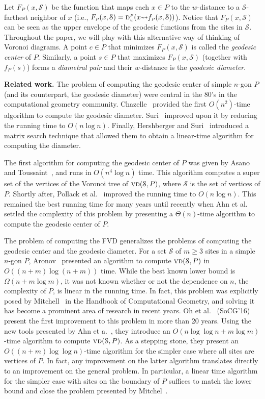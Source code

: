 \documentclass[a4paper,UKenglish]{socg-lipics-v2018}
\newcommand{\F}[2][P]{\ensuremath{F_{\scriptscriptstyle #1}(#2)}}
\newcommand{\s}{\mathcal S}
\newcommand{\dd}[3][P]{\ensuremath{\textsc{d}_{\scriptscriptstyle w}^{\scriptscriptstyle #1}(#2 {\leadsto} #3)}}
\newcommand{\f}[2][P]{\ensuremath{f_{\scriptscriptstyle #1}(#2)}}
\newcommand{\vd}[2][P]{\textsc{vd}(#2, #1)}
\begin{document}
Let $\F{x, \s}$ be the function that maps each $x\in P$ to the $w$-distance to a $\s$-farthest neighbor of $x$ (i.e., $\F{x, \s} = \dd{x}{\f{x, \s}}$).
Notice that $\F{x, \s}$ can be seen as the upper envelope of the geodesic functions from the sites in $\s$.
Throughout the paper, we will play with this alternative way of thinking of Voronoi diagrams.
A point $c\in P$ that minimizes $\F{x, \s}$ is called the \emph{geodesic center} of $P$. 
Similarly, a point $s\in P$ that maximizes $\F{x, \s}$ (together with $\f{s}$) forms a \emph{diametral pair} and their $w$-distance is the \emph{geodesic diameter}. 


\textbf{Related work.} 
The problem of computing the geodesic center of simple $n$-gon $P$ (and its counterpart, the geodesic diameter) were central in the 80's in the computational geometry community. 
Chazelle~\cite{c-tpca-82} provided the first $O(n^2)$-time algorithm to compute the geodesic diameter.
Suri~\cite{suri1989computing} improved upon it by reducing the running time to $O(n\log n)$. 
Finally, Hershberger and Suri~\cite{hershberger1993matrix} introduced a matrix search technique that allowed them to obtain a linear-time algorithm for computing the diameter.

The first algorithm for computing the geodesic center of $P$ was given by Asano and Toussaint~\cite{at-cgcsp-85}, and runs in $O(n^4\log n)$ time.  
This algorithm computes a super set of the vertices of the Voronoi tree of $\vd{\s}$, where $\s$ is the set of vertices of $P$.  
Shortly after, Pollack et al.~\cite{pollackComputingCenter} improved the running time to $O(n\log n)$.  
This remained the best running time for many years until recently when Ahn et al.~\cite{ahn2015linear} settled the complexity of this problem by presenting a $\Theta(n)$-time algorithm to compute the geodesic center of $P$. 

The problem of computing the FVD generalizes the problems of computing the geodesic center and the geodesic diameter.  
For a set $\s$ of $m\geq 3$ sites in a simple $n$-gon $P$, Aronov~\cite{aronov1993furthest} presented an algorithm to compute $\vd{\s}$ in $O((n+m)\log (n+ m))$ time.  
While the best known lower bound is $\Omega(n + m \log m)$, it was not known whether or not the dependence on $n$, the complexity of $P$, is linear in the running time.  
In fact, this problem was explicitly posed by Mitchell~\cite[Chapter 27]{m-gspno-00} in the Handbook of Computational Geometry, and solving it has become a prominent area of research in recent years.
Oh et al.~\cite{oh2016farthest} (SoCG'16) present the first improvement to this problem in more than 20 years. 
Using the new tools presented by Ahn et a.~\cite{ahn2015linear}, they introduce an $O(n \log\log n+m\log m)$-time algorithm to compute $\vd{\s}$. 
As a stepping stone, they present an $O((n+m)\log\log n)$-time algorithm for the simpler case where all sites are vertices of $P$.
In fact, any improvement on the latter algorithm translates directly to an improvement on the general problem.
In particular, a linear time algorithm for the simpler case with sites on the boundary of $P$ suffices to match the lower bound and close the problem presented by Mitchel~\cite[Chapter 27]{m-gspno-00}.
\end{document}
